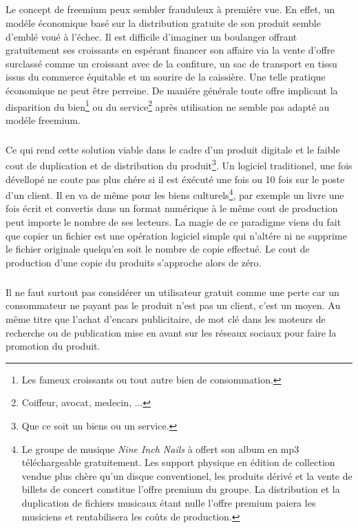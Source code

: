 \documentclass[11pt, a4paper ]{article}
\begin{document}
\begin{spacing}{1.5}

\paragraph{} %
	\subparagraph{} %
Le concept de freemium peux sembler frauduleux à premiére vue. En effet, un modéle économique basé sur la distribution gratuite de son produit semble d'emblé voué à l'échec. Il est difficile d'imaginer un boulanger offrant gratuitement ses croissants en espérant financer son affaire via la vente d'offre surclassé comme un croissant avec de la confiture, un sac de transport en tissu issus du commerce équitable et un sourire de la caissière. Une telle pratique économique ne peut être perreine. De maniére générale toute offre implicant la disparition du bien\footnote{Les fameux croissants ou tout autre bien de consommation.} ou du service\footnote{Coiffeur, avocat, medecin, ...} après utilisation ne semble pas adapté au modéle freemium.
\subparagraph{}
Ce qui rend cette solution viable dans le cadre d'un produit digitale et le faible cout de duplication et de distribution du produit\footnote{Que ce soit un biens ou un service.}. Un logiciel traditionel, une fois dévellopé ne coute pas plus chére si il est éxécuté une fois ou 10 fois sur le poste d'un client. Il en va de même pour les biens culturels\footnote{Le groupe de musique \emph{Nine Inch Nails} à offert son album en mp3 téléchargeable gratuitement. Les support physique en édition de collection vendue plus chère qu'un disque conventionel, les produits dérivé et la vente de billets de concert constitue l'offre premium du groupe. La distribution et la duplication de fichiers musicaux étant nulle l'offre premium paiera les musiciens et rentabilisera les coûts de production.}, par exemple un livre une fois écrit et convertis dans un format numérique à le même cout de production peut importe le nombre de ses lecteurs. La magie de ce paradigme viens du fait que copier un fichier est une opération logiciel simple qui n'altére ni ne supprime le fichier originale quelqu'en soit le nombre de copie effectué. Le cout de production d'une copie du produits s'approche alors de zéro.
\subparagraph{}
Il ne faut surtout pas considérer un utilisateur gratuit comme une perte car un consommateur ne payant pas le produit n'est pas un client, c'est un moyen. Au même titre que l'achat d'encars publicitaire, de mot clé dans les moteurs de recherche ou de publication mise en avant sur les réseaux sociaux pour faire la promotion du produit.

\end{spacing}
\end{document}
